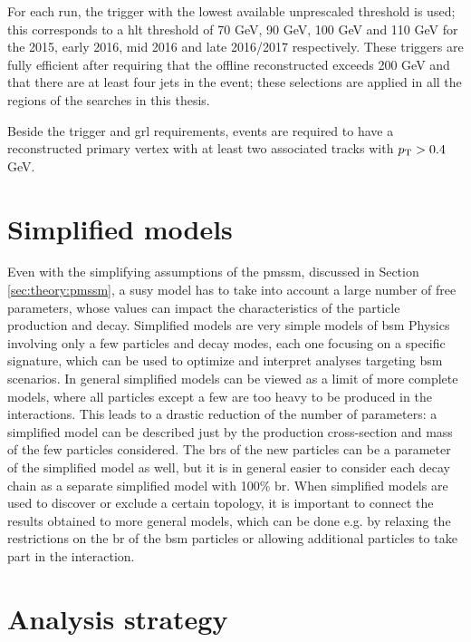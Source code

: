 For each run, the \met trigger with the lowest available unprescaled threshold is used; this corresponds to a \gls{hlt} threshold of 
70 GeV, 90 GeV, 100 GeV and 110 GeV for the 2015, early 2016, mid 2016 and late 2016/2017 respectively. 
These triggers are fully efficient after requiring that the offline reconstructed \met exceeds 200 GeV and that there are at 
least four jets in the event; these selections are applied in all the regions of the searches in this thesis. 

Beside the trigger and \gls{grl} requirements, 
events are required to have a reconstructed primary vertex with at least two associated tracks with $p_{\rm T} > 0.4$ GeV. 


\section{Simplified models}
\label{sec:simplified_models}

Even with the simplifying assumptions of the \gls{pmssm}, discussed in Section \ref{sec:theory:pmssm}, a \gls{susy} model has to take into account a large number of free parameters, whose values can impact the characteristics of the particle production and decay. 
Simplified models \cite{Alves:2011wf} are very simple models of \gls{bsm} Physics involving only a few particles and decay modes, 
each one focusing on a specific signature, which can be used to optimize and interpret analyses targeting \gls{bsm} scenarios. 
In general simplified models can be viewed as a limit of more complete models, where all particles except a few are too heavy to be 
produced in the interactions. This leads to a drastic reduction of the number of parameters: a simplified model can be described just by the production cross-section and mass of the few particles considered. 
The \glspl{br} of the new particles can be a parameter of the simplified model as well, but it is in general easier to consider each decay chain as a separate simplified model with 100\% \gls{br}.
When simplified models are used to discover or exclude a certain topology, it is important to connect the results obtained to more general models, 
which can be done e.g. by relaxing the restrictions on the \gls{br} of the \gls{bsm} particles or allowing additional particles to take part in the interaction.

\section{Analysis strategy}
\label{sec:analysisstrategy}

